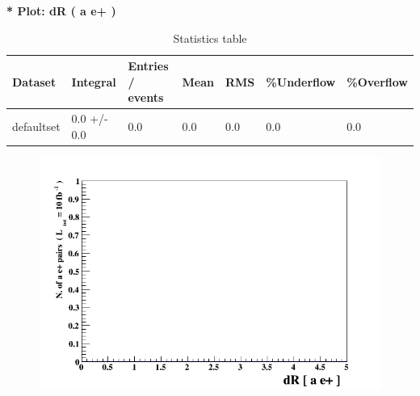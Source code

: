 \documentclass[a4paper, 11pt]{article}
\begin{document}
   \textbf{   * Plot: dR ( a e+ ) }
\textbf{ }\begin{table}[!h]
  \begin{center}
    \caption{ Statistics table}
    \begin{tabular}{|m{17.0mm}|m{27.0mm}|m{23.0mm}|m{18.0mm}|m{18.0mm}|m{14.0mm}|m{14.0mm}|}
      \hline
      \cellcolor{yellow}         Dataset& \cellcolor{yellow}         Integral& \cellcolor{yellow}         Entries /\- events& \cellcolor{yellow}         Mean& \cellcolor{yellow}         RMS& \cellcolor{yellow}         \%Underflow& \cellcolor{yellow}         \%Overflow\\
      \hline
      \cellcolor{white}         defaultset& \cellcolor{white}         0.0 +/\-- 0.0& \cellcolor{white}         0.0& \cellcolor{white}         0.0& \cellcolor{white}         0.0& \cellcolor{green}         0.0& \cellcolor{green}         0.0\\
\hline
    \end{tabular}
  \end{center}
\end{table}

\begin{figure}[!h]
  \begin{center}
    \includegraphics[scale=0.6]{selection_0.png}\\
\caption{}
  \end{center}
\end{figure}
\newpage
   
\end{document}
